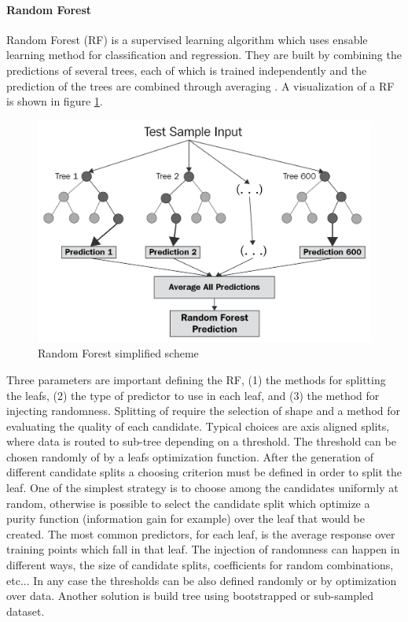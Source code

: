 \documentclass[%
    corpo=12pt,
    twoside,
    oldstyle,
    autoretitolo,
    greek,
    evenboxes,
]{toptesi}
\begin{document}
\paragraph{Random Forest}
Random Forest (RF) is a supervised learning algorithm which uses ensable learning method for classification and regression. They are built by combining the predictions of several trees, each of which is trained independently and the prediction of the trees are combined through averaging \cite{RF_theory}. A visualization of a RF is shown in figure \ref{fig:rf}.\\
\begin{figure}[!h]
  \includegraphics[width=\linewidth]{figure/rf.png}
  \caption{Random Forest simplified scheme \cite{rf}}
  \label{fig:rf}
\end{figure}
Three parameters are important defining the RF, (1) the methods for splitting the leafs, (2) the type of predictor to use in each leaf, and (3) the method for injecting randomness.
Splitting of require the selection of shape and a method for evaluating the quality of each candidate. Typical choices are axis aligned splits, where data is routed to sub-tree depending on a threshold. The threshold can be chosen randomly of by a leafs optimization function. After the generation of different candidate splits a choosing criterion must be defined in order to split the leaf. One of the simplest strategy is to choose among the candidates uniformly at random, otherwise is possible to select the candidate split which optimize a purity function (information gain for example) over the leaf that would be created.
The most common predictors, for each leaf, is the average response over training points which fall in that leaf.
The injection of randomness can happen in different ways, the size of candidate splits, coefficients for random combinations, etc... In any case the thresholds can be also defined randomly or by optimization over data. Another solution is build tree using bootstrapped or sub-sampled dataset.\\
\end{document}
